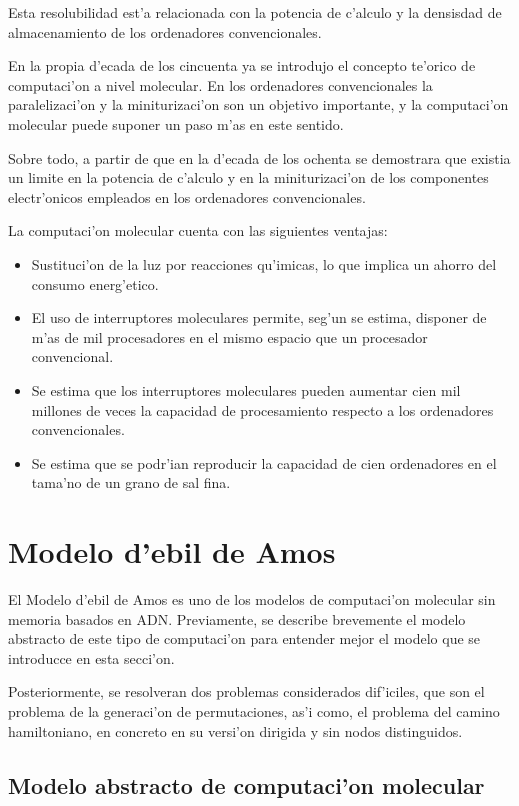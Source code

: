 \documentclass[12pt]{article}
\begin{document}
Esta resolubilidad est'a relacionada con la potencia de c'alculo y la densisdad de almacenamiento de los
ordenadores convencionales.

En la propia d'ecada de los cincuenta ya se introdujo el concepto te'orico de computaci'on a nivel molecular.
En los ordenadores convencionales la paralelizaci'on y la miniturizaci'on son un objetivo importante, y la
computaci'on molecular puede suponer un paso m'as en este sentido.

Sobre todo, a partir de que en la d'ecada de los ochenta se demostrara que existia un limite en la potencia
de c'alculo y en la miniturizaci'on de los componentes electr'onicos empleados en los ordenadores convencionales.

La computaci'on molecular cuenta con las siguientes ventajas:

\begin{itemize}
	\item Sustituci'on de la luz por reacciones qu'imicas, lo que implica un ahorro del consumo energ'etico.
	\item El uso de interruptores moleculares permite, seg'un se estima, disponer de m'as de mil procesadores
    en el mismo espacio que un procesador convencional.
	\item Se estima que los interruptores moleculares pueden aumentar cien mil millones de veces la capacidad
    de procesamiento respecto a los ordenadores convencionales.
	\item Se estima que se podr'ian reproducir la capacidad de cien ordenadores en el tama'no de un grano de sal fina.
\end{itemize}

\section{Modelo d'ebil de Amos}

El Modelo d'ebil de Amos es uno de los modelos de computaci'on molecular sin memoria basados en ADN.
Previamente, se describe brevemente el modelo abstracto de este tipo de computaci'on para entender mejor
el modelo que se introducce en esta secci'on.

Posteriormente, se resolveran dos problemas considerados dif'iciles, que son el problema de la generaci'on de
permutaciones, as'i como, el problema del camino hamiltoniano, en concreto en su versi'on dirigida
y sin nodos distinguidos.

\subsection{Modelo abstracto de computaci'on molecular}
\end{document}

